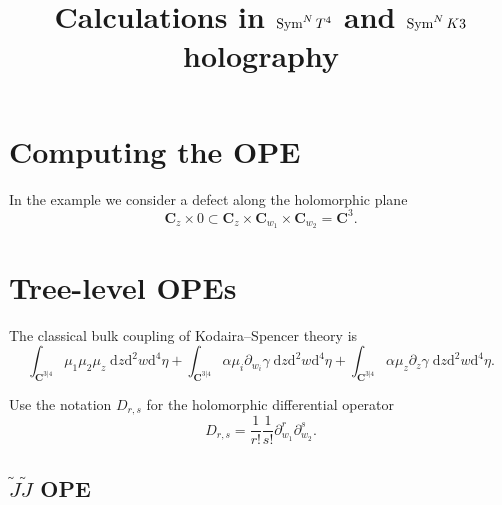 \documentclass[11pt]{amsart}
\date{}
\title{Calculations in $\operatorname{Sym}^N T^4$ and $\operatorname{Sym}^N K3$ holography}
\newcommand{\dbar}{\br{\partial}}
\newcommand{\del}{\partial}
\newcommand{\PV}{\op{PV}}
\newcommand{\til}{\widetilde}
\newcommand{\br}{\overline}
\newcommand{\C}{\mathbf C}
\newcommand{\CC}{\mathbf C}
\newcommand{\op}{\operatorname}
\renewcommand{\d}{\mathrm{d}}
\theoremstyle{thm}
\numberwithin{equation}{subsection}
\theoremstyle{def}
\theoremstyle{rem}
\begin{document}
\maketitle

%

\section{Computing the OPE}

In the example we consider a defect along the holomorphic plane 
\[
\CC_z \times 0 \subset \CC_z \times \CC_{w_1} \times \CC_{w_2} = \CC^3. 
\]

\section{Tree-level OPEs}


The classical bulk coupling of Kodaira--Spencer theory is
\[
\int_{\CC^{3|4}} \mu_1 \mu_2 \mu_z \; \d z \d^2 w \d^4 \eta + \int_{\CC^{3|4}} \alpha \mu_i \partial_{w_i} \gamma \; \d z \d^2 w \d^4 \eta + \int_{\CC^{3|4}} \alpha \mu_z \partial_z \gamma \; \d z \d^2 w \d^4 \eta .
\]

Use the notation $D_{r,s}$ for the holomorphic differential operator
\[ 
	D_{r,s} = \frac{1}{r!} \frac{1}{s!} \partial_{w_1}^r \partial_{w_2}^s. 
\]  

\subsection{$\til J \til J$ OPE}
\end{document}
